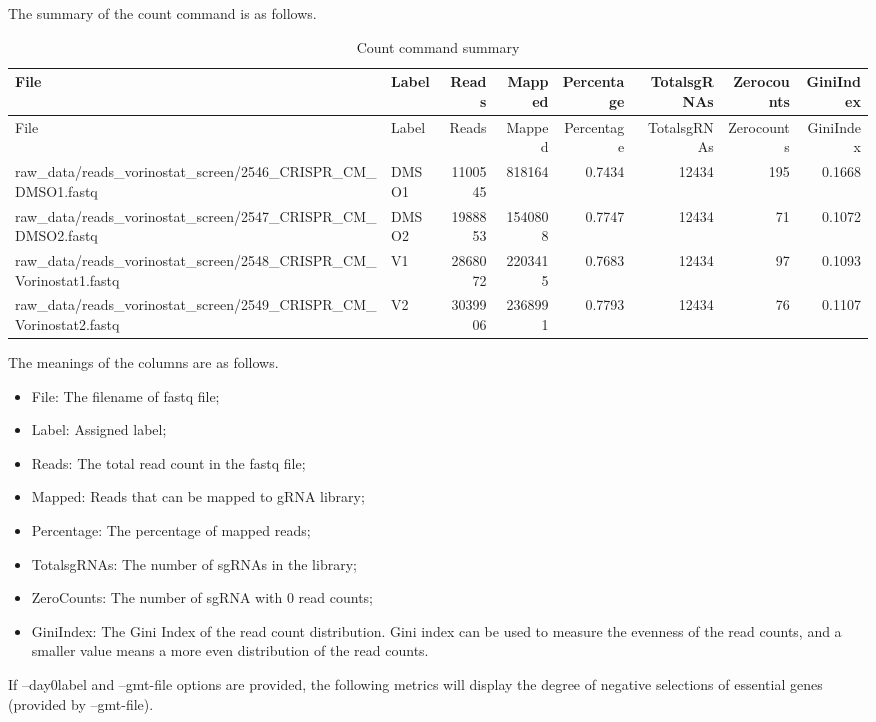 \documentclass[]{article}
\providecommand{\tightlist}{%
  \setlength{\itemsep}{0pt}\setlength{\parskip}{0pt}}
\begin{document}
The summary of the count command is as follows.

\begin{longtable}[]{@{}llrrrrrr@{}}
\caption{Count command summary}\tabularnewline
\toprule
File & Label & Reads & Mapped & Percentage & TotalsgRNAs & Zerocounts &
GiniIndex\tabularnewline
\midrule
\endfirsthead
\toprule
File & Label & Reads & Mapped & Percentage & TotalsgRNAs & Zerocounts &
GiniIndex\tabularnewline
\midrule
\endhead
raw\_data/reads\_vorinostat\_screen/2546\_CRISPR\_CM\_DMSO1.fastq &
DMSO1 & 1100545 & 818164 & 0.7434 & 12434 & 195 & 0.1668\tabularnewline
raw\_data/reads\_vorinostat\_screen/2547\_CRISPR\_CM\_DMSO2.fastq &
DMSO2 & 1988853 & 1540808 & 0.7747 & 12434 & 71 & 0.1072\tabularnewline
raw\_data/reads\_vorinostat\_screen/2548\_CRISPR\_CM\_Vorinostat1.fastq
& V1 & 2868072 & 2203415 & 0.7683 & 12434 & 97 & 0.1093\tabularnewline
raw\_data/reads\_vorinostat\_screen/2549\_CRISPR\_CM\_Vorinostat2.fastq
& V2 & 3039906 & 2368991 & 0.7793 & 12434 & 76 & 0.1107\tabularnewline
\bottomrule
\end{longtable}

The meanings of the columns are as follows.

\begin{itemize}
\tightlist
\item
  File: The filename of fastq file;
\item
  Label: Assigned label;
\item
  Reads: The total read count in the fastq file;
\item
  Mapped: Reads that can be mapped to gRNA library;
\item
  Percentage: The percentage of mapped reads;
\item
  TotalsgRNAs: The number of sgRNAs in the library;
\item
  ZeroCounts: The number of sgRNA with 0 read counts;
\item
  GiniIndex: The Gini Index of the read count distribution. Gini index
  can be used to measure the evenness of the read counts, and a smaller
  value means a more even distribution of the read counts.
\end{itemize}

If --day0label and --gmt-file options are provided, the following
metrics will display the degree of negative selections of essential
genes (provided by --gmt-file).
\end{document}
